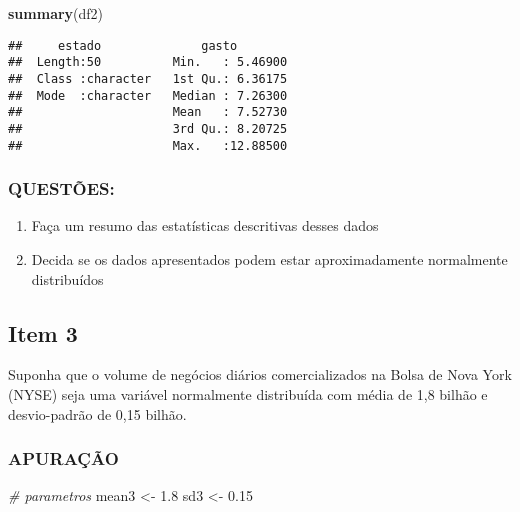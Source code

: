 \documentclass[
]{article}
\newenvironment{Shaded}{\begin{snugshade}}{\end{snugshade}}
\newcommand{\CommentTok}[1]{\textcolor[rgb]{0.56,0.35,0.01}{\textit{#1}}}
\newcommand{\FloatTok}[1]{\textcolor[rgb]{0.00,0.00,0.81}{#1}}
\newcommand{\FunctionTok}[1]{\textcolor[rgb]{0.13,0.29,0.53}{\textbf{#1}}}
\newcommand{\NormalTok}[1]{#1}
\newcommand{\OtherTok}[1]{\textcolor[rgb]{0.56,0.35,0.01}{#1}}
\providecommand{\tightlist}{%
  \setlength{\itemsep}{0pt}\setlength{\parskip}{0pt}}
\begin{document}
\begin{Shaded}
\begin{Highlighting}[]
\FunctionTok{summary}\NormalTok{(df2)}
\end{Highlighting}
\end{Shaded}

\begin{verbatim}
##     estado              gasto         
##  Length:50          Min.   : 5.46900  
##  Class :character   1st Qu.: 6.36175  
##  Mode  :character   Median : 7.26300  
##                     Mean   : 7.52730  
##                     3rd Qu.: 8.20725  
##                     Max.   :12.88500
\end{verbatim}

\hypertarget{questuxf5es-1}{%
\subsubsection{QUESTÕES:}\label{questuxf5es-1}}

\begin{enumerate}
\def\labelenumi{\alph{enumi})}
\tightlist
\item
  Faça um resumo das estatísticas descritivas desses dados\\
\item
  Decida se os dados apresentados podem estar aproximadamente
  normalmente distribuídos
\end{enumerate}

\hypertarget{item-3}{%
\subsection{Item 3}\label{item-3}}

Suponha que o volume de negócios diários comercializados na Bolsa de
Nova York (NYSE) seja uma variável normalmente distribuída com média de
1,8 bilhão e desvio-padrão de 0,15 bilhão.

\hypertarget{apurauxe7uxe3o-2}{%
\subsubsection{APURAÇÃO}\label{apurauxe7uxe3o-2}}

\begin{Shaded}
\begin{Highlighting}[]
\CommentTok{\# parametros}
\NormalTok{mean3 }\OtherTok{\textless{}{-}} \FloatTok{1.8}
\NormalTok{sd3 }\OtherTok{\textless{}{-}} \FloatTok{0.15}
\end{Highlighting}
\end{Shaded}
\end{document}
